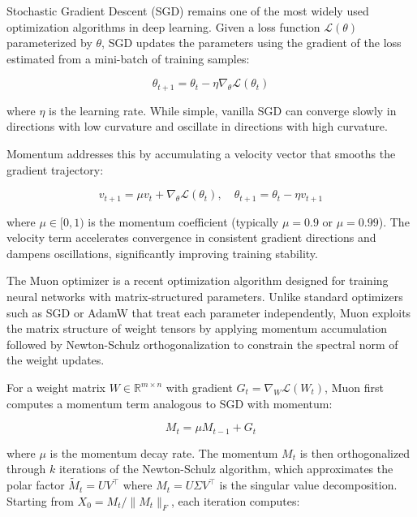 
Stochastic Gradient Descent (SGD) remains one of the most widely used optimization algorithms in deep learning. Given a loss function $\mathcal{L}(\theta)$ parameterized by $\theta$, SGD updates the parameters using the gradient of the loss estimated from a mini-batch of training samples:

\begin{equation}
    \theta_{t+1} = \theta_t - \eta \nabla_{\theta} \mathcal{L}(\theta_t)
\end{equation}

where $\eta$ is the learning rate. While simple, vanilla SGD can converge slowly in directions with low curvature and oscillate in directions with high curvature.

Momentum \cite{sutskever2013momentum} addresses this by accumulating a velocity vector that smooths the gradient trajectory:

\begin{equation}
    v_{t+1} = \mu v_t + \nabla_{\theta} \mathcal{L}(\theta_t), \quad
    \theta_{t+1} = \theta_t - \eta v_{t+1}
\end{equation}

where $\mu \in [0, 1)$ is the momentum coefficient (typically $\mu = 0.9$ or $\mu = 0.99$). The velocity term accelerates convergence in consistent gradient directions and dampens oscillations, significantly improving training stability.

\label{sec:muon}

The Muon optimizer \cite{chen2025muon} is a recent optimization algorithm designed for training neural networks with matrix-structured parameters. Unlike standard optimizers such as SGD or AdamW that treat each parameter independently, Muon exploits the matrix structure of weight tensors by applying momentum accumulation followed by Newton-Schulz orthogonalization to constrain the spectral norm of the weight updates.

For a weight matrix $W \in \mathbb{R}^{m \times n}$ with gradient $G_t = \nabla_W \mathcal{L}(W_t)$, Muon first computes a momentum term analogous to SGD with momentum:

\begin{equation}
    M_t = \mu M_{t-1} + G_t
\end{equation}

where $\mu$ is the momentum decay rate. The momentum $M_t$ is then orthogonalized through $k$ iterations of the Newton-Schulz algorithm, which approximates the polar factor $\widetilde{M}_t = UV^\top$ where $M_t = U \Sigma V^\top$ is the singular value decomposition. Starting from $X_0 = M_t / \|M_t\|_F$, each iteration computes:

